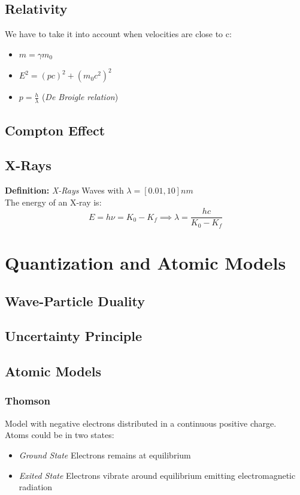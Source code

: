 \documentclass{myclass}
\newcommand{\defi}[1]{\textbf{Definition:} \textit{#1}}
\begin{document}
\subsection{Relativity}
We have to take it into account when velocities are close to c:
\begin{itemize}
    \item $m=\gamma m_0 $
    \item $E^2=(pc)^2 + (m_0c^2)^2$
    \item $p = \frac{h}{\lambda}$ (\textit{De Broigle relation})
\end{itemize}

\subsection{Compton Effect}

\subsection{X-Rays}
\defi{X-Rays} Waves with $\lambda = [0.01, 10] nm$ \\
The energy of an X-ray is:
$$
E = h\nu = K_0-K_f \implies \lambda = \frac{hc}{K_0-K_f} 
$$

\section{Quantization and Atomic Models}
\subsection{Wave-Particle Duality}

\subsection{Uncertainty Principle}

\subsection{Atomic Models}
\subsubsection{Thomson}
Model with negative electrons distributed in a continuous positive charge. \\
Atoms could be in two states:
\begin{itemize}
    \item \textit{Ground State} Electrons remains at equilibrium
    \item \textit{Exited State} Electrons vibrate around equilibrium emitting electromagnetic radiation
\end{itemize}
\end{document}
